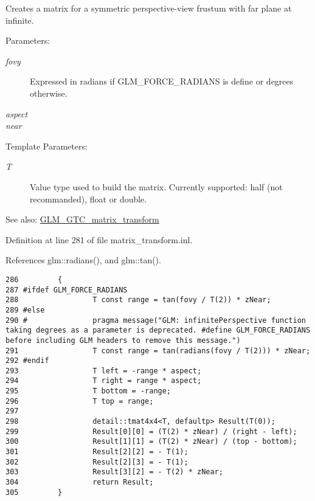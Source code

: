 Creates a matrix for a symmetric perspective-view frustum with far plane at infinite.

\begin{Desc}
\item[Parameters:]
\begin{description}
\item[{\em fovy}]Expressed in radians if GLM\_\-FORCE\_\-RADIANS is define or degrees otherwise. \item[{\em aspect}]\item[{\em near}]\end{description}
\end{Desc}
\begin{Desc}
\item[Template Parameters:]
\begin{description}
\item[{\em T}]Value type used to build the matrix. Currently supported: half (not recommanded), float or double. \end{description}
\end{Desc}
\begin{Desc}
\item[See also:]\hyperlink{group__gtc__matrix__transform}{GLM\_\-GTC\_\-matrix\_\-transform} \end{Desc}


Definition at line 281 of file matrix\_\-transform.inl.

References glm::radians(), and glm::tan().

\begin{Code}\begin{verbatim}286         {
287 #ifdef GLM_FORCE_RADIANS
288                 T const range = tan(fovy / T(2)) * zNear;       
289 #else
290 #               pragma message("GLM: infinitePerspective function taking degrees as a parameter is deprecated. #define GLM_FORCE_RADIANS before including GLM headers to remove this message.")
291                 T const range = tan(radians(fovy / T(2))) * zNear;      
292 #endif
293                 T left = -range * aspect;
294                 T right = range * aspect;
295                 T bottom = -range;
296                 T top = range;
297 
298                 detail::tmat4x4<T, defaultp> Result(T(0));
299                 Result[0][0] = (T(2) * zNear) / (right - left);
300                 Result[1][1] = (T(2) * zNear) / (top - bottom);
301                 Result[2][2] = - T(1);
302                 Result[2][3] = - T(1);
303                 Result[3][2] = - T(2) * zNear;
304                 return Result;
305         }
\end{verbatim}
\end{Code}




